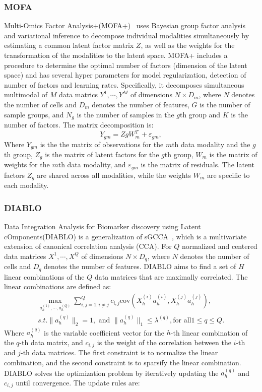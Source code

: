 \subsubsection{MOFA}
Multi-Omics Factor Analysis+(MOFA+)~\cite{argelaguet2020mofa+} uses Bayesian group factor analysis and variational inference to decompose individual modalities simultaneously by estimating a common latent factor matrix $Z$, as well as the weights for the transformation of the modalities to the latent space. MOFA+ includes a procedure to determine the optimal number of factors (dimension of the latent space) and has several hyper parameters for model regularization, detection of number of factors and learning rates. Specifically, it decomposes simultaneous multimodal of $M$ data matrics $Y^1, \cdots, Y^M$ of dimensions $N\times D_m$, where $N$ denotes the number of cells and $D_m$ denotes the number of features, $G$ is the number of sample groups, and $N_g$ is the number of samples in the $g$th group and $K$ is the number of factors. The matrix decomposition is:
\begin{equation}
Y_{gm} = ZgW_m^{T} + \varepsilon_{gm}, 
\end{equation}
Where $Y_{gm}$ is the the matrix of observations for the $m$th data modality and the $g$th group, $Z_g$ is the matrix of latent factors for the $g$th group, $W_m$ is the matrix of weights for the $m$th data modality, and $\varepsilon_{gm}$ is the matrix of residuals. The latent factors $Z_g$ are shared across all modalities, while the weights $W_m$ are specific to each modality. %


\subsubsection{DIABLO}
Data Integration Analysis for Biomarker discovery using Latent cOmponents(DIABLO) is a generalization of sGCCA~\citep{tenenhaus2014variable}, which is a multivariate extension of canonical correlation analysis (CCA). For $Q$ normalized and centered data matrices $X^1, \cdots, X^Q$ of dimensions $N\times D_q$, where $N$ denotes the number of cells and $D_q$ denotes the number of features. DIABLO aims to find a set of $H$ linear combinations of the $Q$ data matrices that are maximally correlated. The linear combinations are defined as:
\begin{equation}
\begin{aligned}
	\underset{a_h^{(1)},\cdots,a_h^{(Q)}}{\max} \sum_{i,j=1, i\neq j}^Q c_{i,j} \text{cov}(X_h^{(i)} a_h^{(i)}, X_h^{(j)} a_h^{(j)}),\\
	s.t. \|a_h^{(q)}\|_2 = 1, \text{ and } \|a_h^{(q)}\|_1 \leq \lambda^{(q)}, \text{for all} 1\leq q \leq Q.
\end{aligned}
\end{equation}
Where $a_h^{(q)}$ is the variable coefficient vector for the $h$-th linear combination of the $q$-th data matrix, and $c_{i,j}$ is the weight of the correlation between the $i$-th and $j$-th data matrices. The first constraint is to normalize the linear combination, and the second constraint is to sparsify the linear combination. DIABLO solves the optimization problem by iteratively updating the $a_h^{(q)}$ and $c_{i,j}$ until convergence. The update rules are:

